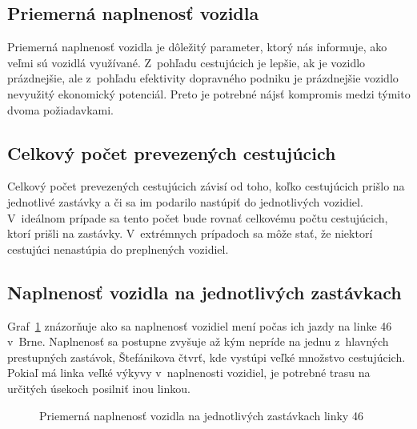 \subsection*{Priemerná naplnenosť vozidla}
Priemerná naplnenosť vozidla je dôležitý parameter, ktorý nás informuje, ako veľmi sú vozidlá využívané.
Z~pohľadu cestujúcich je lepšie, ak je vozidlo prázdnejšie, ale z~pohľadu efektivity dopravného podniku je prázdnejšie vozidlo nevyužitý ekonomický potenciál.
Preto je potrebné nájsť kompromis medzi týmito dvoma požiadavkami.

\subsection*{Celkový počet prevezených cestujúcich}
Celkový počet prevezených cestujúcich závisí od toho, koľko cestujúcich prišlo na jednotlivé zastávky a či sa im podarilo nastúpiť do jednotlivých vozidiel.
V~ideálnom prípade sa tento počet bude rovnať celkovému počtu cestujúcich, ktorí prišli na zastávky.
V~extrémnych prípadoch sa môže stať, že niektorí cestujúci nenastúpia do preplnených vozidiel.

\subsection*{Naplnenosť vozidla na jednotlivých zastávkach}
Graf~\ref{fig:averageLoad} znázorňuje ako sa naplnenosť vozidiel mení počas ich jazdy na linke 46 v~Brne.
Naplnenosť sa postupne zvyšuje až kým nepríde na jednu z~hlavných prestupných zastávok, Štefánikova čtvrť, kde vystúpi veľké množstvo cestujúcich.
Pokiaľ má linka veľké výkyvy v~naplnenosti vozidiel, je potrebné trasu na určitých úsekoch posilniť inou linkou.
\begin{figure}[h]\label{fig:averageLoad}
  \centering
  \caption{Priemerná naplnenosť vozidla na jednotlivých zastávkach linky 46}
\end{figure}

